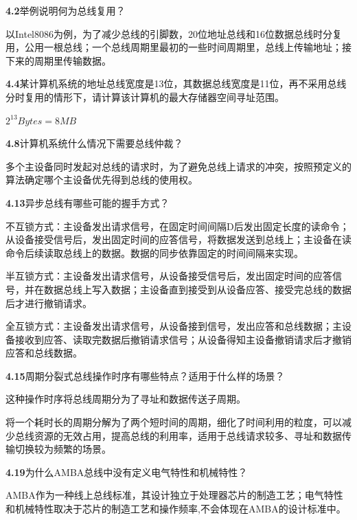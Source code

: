 \documentclass{article}
\begin{document}
    \noindent\textbf{4.2}举例说明何为总线复用？\par
    以Intel8086为例，为了减少总线的引脚数，20位地址总线和16位数据总线时分复用，公用一根总线；一个总线周期里最初的一些时间周期里，总线上传输地址；接下来的周期里传输数据。
    \\[4pt]\par

    \noindent\textbf{4.4}某计算机系统的地址总线宽度是13位，其数据总线宽度是11位，再不采用总线分时复用的情形下，请计算该计算机的最大存储器空间寻址范围。\par
    $2^{13}Bytes=8MB$
    \\[4pt]\par

    \noindent\textbf{4.8}计算机系统什么情况下需要总线仲裁？\par
    多个主设备同时发起对总线的请求时，为了避免总线上请求的冲突，按照预定义的算法确定哪个主设备优先得到总线的使用权。
    \\[4pt]\par

    \noindent\textbf{4.13}异步总线有哪些可能的握手方式？\par
    不互锁方式：主设备发出请求信号，在固定时间间隔D后发出固定长度的读命令；从设备接受信号后，发出固定时间的应答信号，将数据发送到总线上；主设备在读命令后续读取总线上的数据。数据的同步依靠固定的时间间隔来实现。\par
    半互锁方式：主设备发出请求信号，从设备接受信号后，发出固定时间的应答信号，并在数据总线上写入数据；主设备直到接受到从设备应答、接受完总线的数据后才进行撤销请求。\par
    全互锁方式：主设备发出请求信号，从设备接到信号，发出应答和总线数据；主设备接收到应答、读取完数据后撤销请求信号；从设备得知主设备撤销请求后才撤销应答和总线数据。
    \\[4pt]\par

    \noindent\textbf{4.15}周期分裂式总线操作时序有哪些特点？适用于什么样的场景？\par
    这种操作时序将总线周期分为了寻址和数据传送子周期。\par
    将一个耗时长的周期分解为了两个短时间的周期，细化了时间利用的粒度，可以减少总线资源的无效占用，提高总线的利用率，适用于总线请求较多、寻址和数据传输切换较为频繁的场景。
    \\[4pt]\par

    \noindent\textbf{4.19}为什么AMBA总线中没有定义电气特性和机械特性？\par
    AMBA作为一种线上总线标准，其设计独立于处理器芯片的制造工艺；电气特性和机械特性取决于芯片的制造工艺和操作频率,不会体现在AMBA的设计标准中。
    \\[4pt]\par
\end{document}
